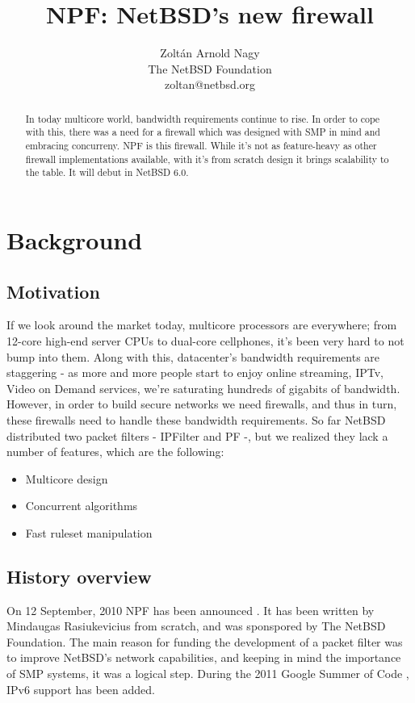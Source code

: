 \documentclass[11pt,twocolumn]{article}
\begin{document}
\title{NPF: NetBSD's new firewall}
\author{Zoltán Arnold Nagy \\ The NetBSD Foundation \\ zoltan@netbsd.org}
\date{}

\maketitle

\begin{abstract}
In today multicore world, bandwidth requirements continue to rise. In order to cope
with this, there was a need for a firewall which was designed with SMP in mind and embracing
concurreny. NPF is this firewall. While it's not as feature-heavy as other firewall
implementations available, with it's from scratch design it brings scalability to the table.
It will debut in NetBSD 6.0.
\end{abstract}

\section{Background}
\subsection{Motivation}
If we look around the market today, multicore processors are everywhere; from 12-core
high-end server CPUs to dual-core cellphones, it's been very hard to not bump into them.
Along with this, datacenter's bandwidth requirements are staggering - as more and more people
start to enjoy online streaming, IPTv, Video on Demand services, we're saturating hundreds
of gigabits of bandwidth. However, in order to build secure networks we need firewalls, and
thus in turn, these firewalls need to handle these bandwidth requirements.
So far NetBSD distributed two packet filters - IPFilter and PF -, but we realized they lack
a number of features, which are the following:
\begin{itemize}
	\item Multicore design
	\item Concurrent algorithms
	\item Fast ruleset manipulation
\end{itemize}

\subsection{History overview}
On 12 September, 2010 NPF has been announced \cite{npf_announce}. It has been written by Mindaugas Rasiukevicius
from scratch, and was sponspored by The NetBSD Foundation. The main reason for funding the
development of a packet filter was to improve NetBSD's network capabilities, and keeping
in mind the importance of SMP systems, it was a logical step. During the 2011 Google
Summer of Code \cite{gsoc}, IPv6 support has been added. \cite{ipv6_proposal}
\end{document}
